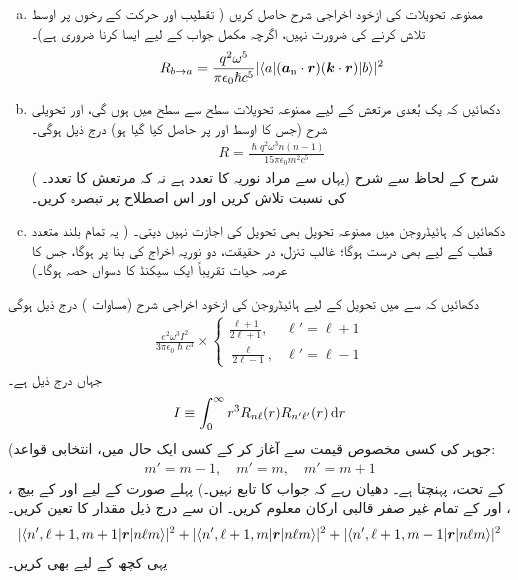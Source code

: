 \begin{enumerate}[a.]
\item
ممنوعہ تحویلات کی ازخود اخراجی شرح حاصل کریں ( تقطیب اور حرکت کے رخوں پر اوسط تلاش کرنے کی ضرورت نہیں، اگرچہ مکمل جواب کے لیے ایسا کرنا ضروری ہے)۔ 
\begin{align}
	R_{b\to a} = \frac{q^2\omega^5}{\pi\epsilon_0\hslash c^5}|\langle a|({{\boldsymbol{a}}_{\textup{n}}}\cdot{\ensuremath{{\boldsymbol{r}}}})({\boldsymbol{k}}\cdot {\ensuremath{{\boldsymbol{r}}}})|b \rangle|^2
\end{align}
\item
 دکھائیں کہ یک بُعدی مرتعش کے لیے ممنوعہ تحویلات سطح  سے سطح  میں ہوں گی، اور تحویلی شرح (جس کا اوسط  اور  پر حاصل کیا گیا ہو) درج ذیل ہوگی۔
\begin{align}
	R = \frac{\hslash q^2\omega^3n(n-1)}{15\pi\epsilon_0m^2c^5}
\end{align}
( یہاں  سے مراد نوریہ کا تعدد ہے نہ کہ مرتعش کا تعدد۔) شرح کے لحاظ سے  شرح کی نسبت تلاش کریں اور اس اصطلاح پر تبصرہ کریں۔
\item
 دکھائیں کہ ہائیڈروجن میں ممنوعہ تحویل بھی  تحویل کی اجازت نہیں دیتی۔ ( یہ تمام بلند متعدد قطب کے لیے بھی درست ہوگا؛ غالب تنزل، در حقیقت، دو نوریہ اخراج کی بنا پر ہوگا، جس کا عرصہ حیات تقریباً ایک سیکنڈ کا دسواں حصہ ہوگا۔)
 \end{enumerate}
دکھائیں کہ  سے  میں تحویل کے لیے ہائیڈروجن کی ازخود اخراجی شرح (مساوات ) درج ذیل ہوگی
\begin{align}
	\frac{e^2\omega^3I^2}{3\pi\epsilon_0\hslash c^3}\times
	\begin{cases}
		\frac{\ell +1}{2\ell +1}, & \ell '= \ell +1 \\
		\frac{\ell }{2\ell -1}, & \ell '= \ell -1 
	\end{cases}
\end{align}
جہاں  درج ذیل ہے۔
\begin{align}
	I\equiv\int_{0}^{\infty} r^3R_{n\ell }(r)R_{n'\ell '}(r)\dif r
\end{align}
(جوہر  کی کسی مخصوص قیمت سے آغاز کر کے کسی ایک  حال میں، انتخابی قواعد:
\begin{align*}
m'=m-1,\quad m'=m,\quad m'=m+1
\end{align*}
 کے تحت، پہنچتا ہے۔ دھیان رہے کہ جواب  کا تابع نہیں۔)  پہلے  صورت کے لیے  اور  کے بیچ ، ، اور  کے تمام غیر صفر قالبی ارکان معلوم کریں۔ ان سے درج ذیل مقدار کا تعین کریں۔
\begin{align*}
	|\langle n', \ell +1,m+1|{{\boldsymbol{r}}}|n\ell m \rangle|^2 + |\langle n', \ell +1, m|{{\boldsymbol{r}}}|n\ell m \rangle|^2+|\langle n', \ell +1, m-1|{{\boldsymbol{r}}}|n\ell m\rangle|^2
\end{align*}
یہی کچھ  کے لیے بھی کریں۔

